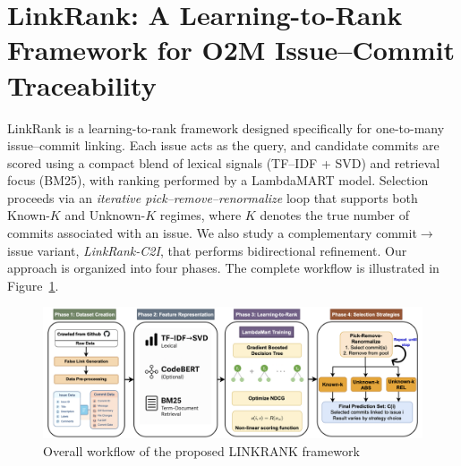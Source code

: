 \section{LinkRank: A Learning-to-Rank Framework for O2M Issue--Commit Traceability}


LinkRank is a learning-to-rank framework designed specifically for one-to-many issue--commit linking. Each issue acts as the query, and candidate commits are scored using a compact blend of lexical signals (TF--IDF + SVD) and retrieval focus (BM25), with ranking performed by a LambdaMART model. Selection proceeds via an \emph{iterative pick--remove--renormalize} loop that supports both Known-$K$ and Unknown-$K$ regimes, where $K$ denotes the true number of commits associated with an issue. We also study a complementary commit$\rightarrow$issue variant, \textit{LinkRank-C2I}, that performs bidirectional refinement. Our approach is organized into four phases. The complete workflow is illustrated in Figure~\ref{fig:approach}. 


\begin{figure}[h!]
    \centering
    \includegraphics[width=\textwidth]{figures/App.png}
    \caption{Overall workflow of the proposed LINKRANK framework}
    \label{fig:approach}
\end{figure}

